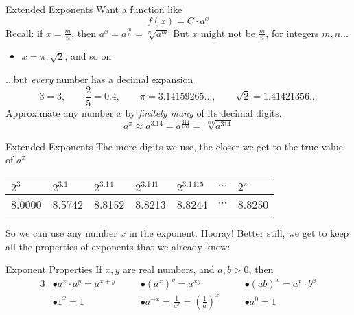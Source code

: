 \documentclass[]{beamer}
\begin{document}
	\begin{frame}{Extended Exponents}
		Want a function like
		\begin{equation*}
			f(x) = C\cdot a^x
		\end{equation*}
		\pause
		Recall: if $x = \frac{m}{n}$, then $a^x = a^\frac{m}{n} = \sqrt[n]{a^m}$
		\pause
		\vfill
		But $x$ might not be $\frac{m}{n}$, for integers $m,n$...
		\pause\vfill
		\begin{itemize}
			\item $x = \pi, \sqrt{2}$, and so on
		\end{itemize}
		\pause
		\vfill
		...but \textit{every} number has a decimal expansion
		\begin{equation*}
			3 = 3, \qquad \frac{2}{5} = 0.4, \qquad \pi=3.14159265..., \qquad \sqrt{2} = 1.41421356...
		\end{equation*}
		\pause\vfill
		Approximate any number $x$ by \textit{finitely many} of its decimal digits.
		\begin{equation*}
			a^\pi \approx a^{3.14} = a^{\frac{314}{100}} = \sqrt[100]{a^{314}}
		\end{equation*}
	\end{frame}

	\begin{frame}{Extended Exponents}
		The more digits we use, the closer we get to the true value of $a^\pi$
		\vfill
		\begin{center}
		\begin{tabular}{@{}lllllcl@{}}
			$2^3$ & $2^{3.1}$ & $2^{3.14}$ & $2^{3.141}$ & $2^{3.1415}$ & $\cdots$ & $2^\pi$\\
			\midrule
			8.0000 & 8.5742 & 8.8152 & 8.8213 & 8.8244 & $\cdots$ & 8.8250
		\end{tabular}
		\end{center}
		\pause
		\vfill
		So we can use any number $x$ in the exponent. Hooray!
		\pause
		\vfill
		Better still, we get to keep all the properties of exponents that we already know:
		\begin{block}{Exponent Properties}
			If $x,y$ are real numbers, and $a,b > 0$, then
			\begin{alignat*}{3}
				&\bullet a^x\cdot a^y = a^{x+y} &\quad &\bullet \left(a^x\right)^y = a^{xy} &\quad &\bullet (ab)^x = a^x\cdot b^x \\
				&\bullet 1^x = 1 &\quad &\bullet a^{-x} = \frac{1}{a^x} = \left(\frac{1}{a}\right)^x &\quad &\bullet a^0 = 1
			\end{alignat*}
		\end{block}
	\end{frame}
\end{document}
